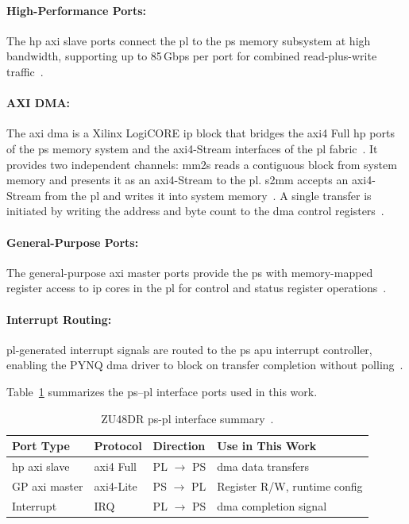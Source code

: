 \paragraph{High-Performance Ports:}
The \ac{hp} \ac{axi} slave ports connect the \ac{pl} to the \ac{ps}
memory subsystem at high bandwidth, supporting up to 85\,Gbps per
port for combined read-plus-write traffic~\cite{Boppana2015}.

\paragraph{AXI DMA:}
\label{subsec:axidma_background}%
The \ac{axi} \ac{dma} is a Xilinx LogiCORE \ac{ip} block that
bridges the \ac{axi}4 Full \ac{hp} ports of the \ac{ps} memory
system and the \ac{axi}4-Stream interfaces of the \ac{pl}
fabric~\cite{AMD_PG021}.
It provides two independent channels: \ac{mm2s} reads a contiguous
block from system memory and presents it as an \ac{axi}4-Stream to
the \ac{pl}.
\ac{s2mm} accepts an \ac{axi}4-Stream from the \ac{pl} and writes
it into system memory~\cite{AMD_PG021}.
A single transfer is initiated by writing the address and byte count
to the \ac{dma} control registers~\cite{AMD_PG021}.

\paragraph{General-Purpose Ports:}
The general-purpose \ac{axi} master ports provide the \ac{ps} with
memory-mapped register access to \ac{ip} cores in the \ac{pl} for
control and status register operations~\cite{AMD_UG1085}.

\paragraph{Interrupt Routing:}
\ac{pl}-generated interrupt signals are routed to the \ac{ps}
\ac{apu} interrupt controller, enabling the PYNQ \ac{dma} driver
to block on transfer completion without polling~\cite{Kovacs2024}.

Table~\ref{tab:pspl_ports} summarizes the \ac{ps}--\ac{pl}
interface ports used in this work.

\begin{table}[htbp]
  \caption{ZU48DR \ac{ps}-\ac{pl} interface summary~\cite{AMD_UG1085,Boppana2015}.}
  \label{tab:pspl_ports}
  \centering
  \begin{tabular}{llll}
    \hline
    Port Type & Protocol & Direction & Use in This Work \\
    \hline
    \ac{hp} \ac{axi} slave & \ac{axi}4 Full  & PL $\to$ PS
      & \ac{dma} data transfers \\[3pt]
    GP \ac{axi} master     & \ac{axi}4-Lite  & PS $\to$ PL
      & Register R/W, runtime config \\[3pt]
    Interrupt              & IRQ              & PL $\to$ PS
      & \ac{dma} completion signal \\
    \hline
  \end{tabular}
\end{table}

